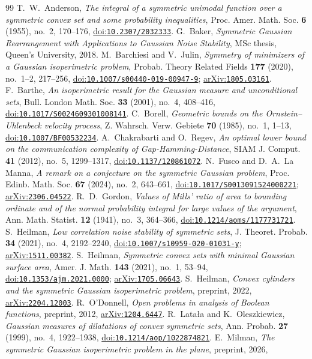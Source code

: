 \documentclass[11pt]{amsart}
\theoremstyle{remark}
\newcommand{\doi}[1]{\href{https://doi.org/#1}{doi:\nolinkurl{#1}}}
\newcommand{\arxiv}[1]{\href{https://arxiv.org/abs/#1}{arXiv:\nolinkurl{#1}}}
\begin{document}
\begin{thebibliography}{99}
 T.~W.~Anderson, \emph{The integral of a symmetric unimodal function over a symmetric convex set and
some probability inequalities}, Proc. Amer. Math. Soc. \textbf{6} (1955), no.~2, 170--176, \doi{10.2307/2032333}.
 G.~Baker, \emph{Symmetric Gaussian Rearrangement with Applications to Gaussian Noise Stability}, MSc
thesis, Queen's University, 2018.
 M.~Barchiesi and V.~Julin, \emph{Symmetry of minimizers of a Gaussian isoperimetric problem}, Probab.
Theory Related Fields \textbf{177} (2020), no.~1--2, 217--256, \doi{10.1007/s00440-019-00947-9}; \arxiv{1805.03161}.
 F.~Barthe, \emph{An isoperimetric result for the Gaussian measure and unconditional sets}, Bull.
London Math. Soc. \textbf{33} (2001), no.~4, 408--416, \doi{10.1017/S0024609301008141}.
 C.~Borell, \emph{Geometric bounds on the Ornstein--Uhlenbeck velocity process}, Z. Wahrsch. Verw.
Gebiete \textbf{70} (1985), no.~1, 1--13, \doi{10.1007/BF00532234}.
 A.~Chakrabarti and O.~Regev, \emph{An optimal lower bound on the communication complexity of
Gap-Hamming-Distance}, SIAM J. Comput. \textbf{41} (2012), no.~5, 1299--1317, \doi{10.1137/120861072}.
 N.~Fusco and D.~A.~La Manna, \emph{A remark on a conjecture on the symmetric Gaussian problem}, Proc.
Edinb. Math. Soc. \textbf{67} (2024), no.~2, 643--661, \doi{10.1017/S0013091524000221}; \arxiv{2306.04522}.
 R.~D.~Gordon, \emph{Values of Mills' ratio of area to bounding ordinate and of the normal probability
integral for large values of the argument}, Ann. Math. Statist. \textbf{12} (1941), no.~3, 364--366,
\doi{10.1214/aoms/1177731721}.
 S.~Heilman, \emph{Low correlation noise stability of symmetric sets}, J. Theoret. Probab. \textbf{34}
(2021), no.~4, 2192--2240, \doi{10.1007/s10959-020-01031-y}; \arxiv{1511.00382}.
 S.~Heilman, \emph{Symmetric convex sets with minimal Gaussian surface area}, Amer. J. Math. \textbf{143}
(2021), no.~1, 53--94, \doi{10.1353/ajm.2021.0000}; \arxiv{1705.06643}.
 S.~Heilman, \emph{Convex cylinders and the symmetric Gaussian isoperimetric problem}, preprint, 2022,
\arxiv{2204.12003}.
 R.~O'Donnell, \emph{Open problems in analysis of Boolean functions}, preprint, 2012, \arxiv{1204.6447}.
 R.~Latała and K.~Oleszkiewicz, \emph{Gaussian measures of dilatations of convex symmetric sets}, Ann.
Probab. \textbf{27} (1999), no.~4, 1922--1938, \doi{10.1214/aop/1022874821}.
 E.~Milman, \emph{The symmetric Gaussian isoperimetric problem in the plane}, preprint, 2026,

\end{thebibliography}
\end{document}
